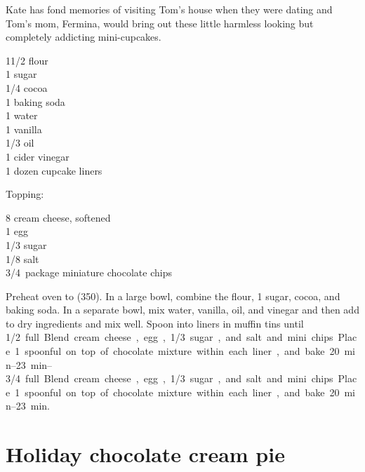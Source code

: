 \begin{open}
    Kate has fond memories of visiting Tom's house when they were dating and Tom's mom, Fermina, would bring out these little harmless looking but completely addicting mini-cupcakes.
\end{open}
\begin{ingredients}
    1\SI{1/2}{\cup} flour\\
    \SI{1}{\cup} sugar\\
    \SI{1/4}{\cup} cocoa\\
    \SI{1}{\teaspoon} baking soda\\
    \SI{1}{\cup} water\\
    \SI{1}{\teaspoon} vanilla\\
    \SI{1/3}{\cup} oil\\
    \SI{1}{\tblspoon} cider vinegar\\
    1 dozen cupcake liners\\
\end{ingredients}

Topping:
\begin{ingredients}
    \SI{8}{\ounce} cream cheese, softened\\
    1 egg\\
    \SI{1/3}{\cup} sugar\\
    \SI{1/8}{\teaspoon} salt\\
    \SI{3/4}{package} miniature chocolate chips\\
\end{ingredients}

Preheat oven to (\SI{350}{\degreeF}). In a large bowl, combine the flour, \SI{1}{\cup} sugar, cocoa, and baking soda. In a separate bowl, mix water, vanilla, oil, and vinegar and then add to dry ingredients and mix well. Spoon into liners in muffin tins until \SIrange{1/2}{3/4} full. Blend cream cheese, egg, \SI{1/3}{\cup} sugar, and salt and mini chips. Place 1 spoonful on top of chocolate mixture within each liner, and bake \SIrange{20}{23}{\minute}.

\section{Holiday chocolate cream pie}

